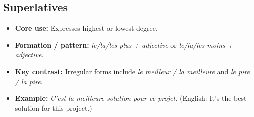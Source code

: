\documentclass{article}
\begin{document}
\subsection{Superlatives}
\begin{itemize}
    \item \textbf{Core use:} Expresses highest or lowest degree.
    \item \textbf{Formation / pattern:} \textit{le/la/les plus + adjective} or \textit{le/la/les moins + adjective}.
    \item \textbf{Key contrast:} Irregular forms include \textit{le meilleur / la meilleure} and \textit{le pire / la pire}.
    \item \textbf{Example:} \textit{C'est la meilleure solution pour ce projet.} (English: It's the best solution for this project.)
\end{itemize}
\end{document}
